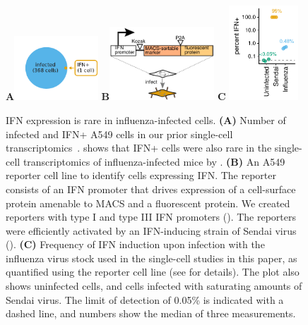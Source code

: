 \documentclass[9pt,lineno]{elife}
\begin{document}
\begin{figure}
\centerline{
{\bf \Large A}\includegraphics[width=0.28\textwidth,valign=t]{figures/IFN_stochastic/RussellVenn/venn_diagram.pdf}
\hspace{0.02\textwidth}
{\bf \Large B}\includegraphics[width=0.35\textwidth,valign=t]{figures/IFN_stochastic/IFN_reporter/IFN_reporter.pdf}
\hspace{0.02\textwidth}
{\bf \Large C} \includegraphics[width=0.23\textwidth,valign=t]{figures/IFN_stochastic/Flow/ifn_percent.pdf}
}
\caption{
IFN expression is rare in influenza-infected cells.
{\bf (A)} Number of infected and IFN+ A549 cells in our prior single-cell transcriptomics~\citep{russell2018extreme}.
 shows that IFN+ cells were also rare in the single-cell transcriptomics of influenza-infected mice by \citet{steuerman2018dissection}.
{\bf (B)} An A549 reporter cell line to identify cells expressing IFN.
The reporter consists of an IFN promoter that drives expression of a cell-surface protein amenable to MACS and a fluorescent protein.
We created reporters with type I and type III IFN promoters ().
The reporters were efficiently activated by an IFN-inducing strain of Sendai virus ().
{\bf (C)}
Frequency of IFN induction upon infection with the influenza virus stock used in the single-cell studies in this paper, as quantified using the reporter cell line (see  for details).
The plot also shows uninfected cells, and cells infected with saturating amounts of Sendai virus.
The limit of detection of 0.05\% is indicated with a dashed line, and numbers show the median of three measurements.
}
\label{fig:IFNrare}


\end{figure}
\end{document}
